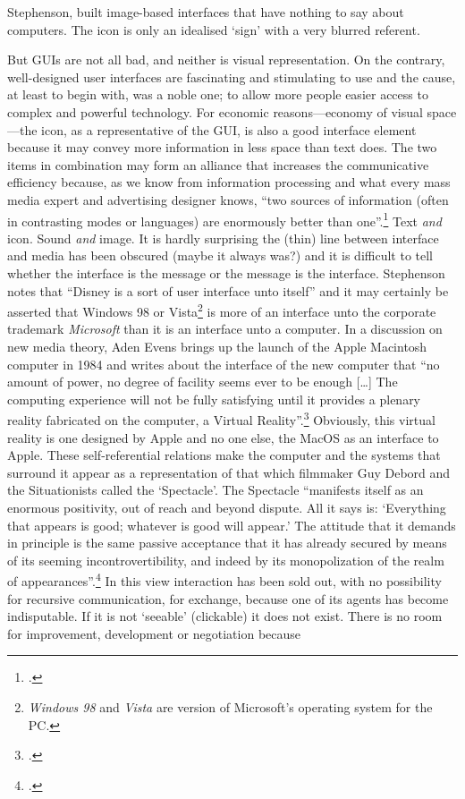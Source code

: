 Stephenson, built image-based interfaces that have nothing to say about computers. The icon is only an idealised `sign' with a very blurred referent. 

\label{sec:human-comp-inter:par3}
\hypertarget{sec:target:human-comp-inter:par3}{But GUIs are not all bad}, and neither is visual representation. On the contrary, well-designed user interfaces are fascinating and stimulating to use and the cause, at least to begin with, was a noble one; to allow more people easier access to complex and powerful technology. For economic reasons---economy of visual space---the icon, as a representative of the GUI, is also a good interface element because it may convey more information in less space than text does. The two items in combination may form an alliance that increases the communicative efficiency because, as we know from information processing and what every mass media expert and advertising designer knows, ``two sources of information (often in contrasting modes or languages) are enormously better than one''.\footcite[73]{Bateson} Text \emph{and} icon. Sound \emph{and} image. It is hardly surprising the (thin) line between interface and media has been obscured (maybe it always was?) and it is difficult to tell whether the interface is the message or the message is the interface. Stephenson notes that ``Disney is a sort of user interface unto itself'' and it may certainly be asserted that Windows 98 or Vista\footnote{\emph{Windows 98} and \emph{Vista} are version of Microsoft's operating system for the PC.} is more of an interface unto the corporate trademark \emph{Microsoft} than it is an interface unto a computer. In a discussion on new media theory, Aden Evens brings up the launch of the Apple Macintosh computer in 1984 and writes about the interface of the new computer that ``no amount of power, no degree of facility seems ever to be enough [\ldots] The computing experience will not be fully satisfying until it provides a plenary reality fabricated on the computer, a Virtual Reality''.\footcite[128]{evens05} Obviously, this virtual reality is one designed by Apple and no one else, the MacOS as an interface to Apple. These self-referential relations make the computer and the systems that surround it appear as a representation of that which filmmaker Guy Debord and the Situationists called the `Spectacle'. The Spectacle ``manifests itself as an enormous positivity, out of reach and beyond dispute. All it says is: `Everything that appears is good; whatever is good will appear.' The attitude that it demands in principle is the same passive acceptance that it has already secured by means of its seeming incontrovertibility, and indeed by its monopolization of the realm of appearances''.\footcite[chap. 1,~\S~12]{debord67} In this view interaction has been sold out, with no possibility for recursive communication, for exchange, because one of its agents has become indisputable. If it is not `seeable' (clickable) it does not exist. There is no room for improvement, development or negotiation because 